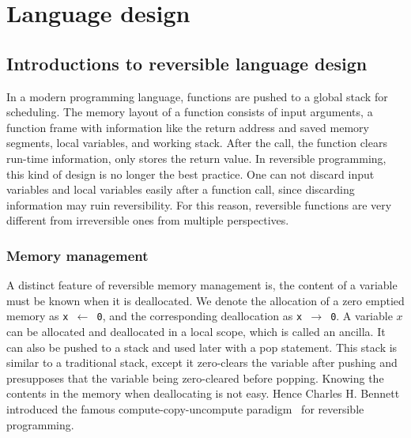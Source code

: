 \documentclass{article}
\newcommand{\<}{\langle}
\renewcommand{\>}{\rangle}
\theoremstyle{definition}\newtheorem{definition}{\textit{Definition}}
\begin{document}
\section{Language design}\label{sec:lang}

    \subsection{Introductions to reversible language design}
    In a modern programming language, functions are pushed to a global stack for scheduling. The memory layout of a function consists of input arguments, a function frame with information like the return address and saved memory segments, local variables, and working stack. After the call, the function clears run-time information, only stores the return value. In reversible programming, this kind of design is no longer the best practice. One can not discard input variables and local variables easily after a function call, since discarding information may ruin reversibility. For this reason, reversible functions are very different from irreversible ones from multiple perspectives.

\subsubsection{Memory management}
    A distinct feature of reversible memory management is, the content of a variable must be known when it is deallocated.
    We denote the allocation of a zero emptied memory as \texttt{x $\leftarrow$ 0}, and the corresponding deallocation as \texttt{x $\rightarrow$ 0}.
    A variable $x$ can be allocated and deallocated in a local scope, which is called an ancilla.
    It can also be pushed to a stack and used later with a pop statement.
    This stack is similar to a traditional stack, except it zero-clears the variable after pushing and presupposes that the variable being zero-cleared before popping.
Knowing the contents in the memory when deallocating is not easy. Hence Charles H. Bennett introduced the famous compute-copy-uncompute paradigm~\cite{Bennett1973} for reversible programming.
\end{document}
